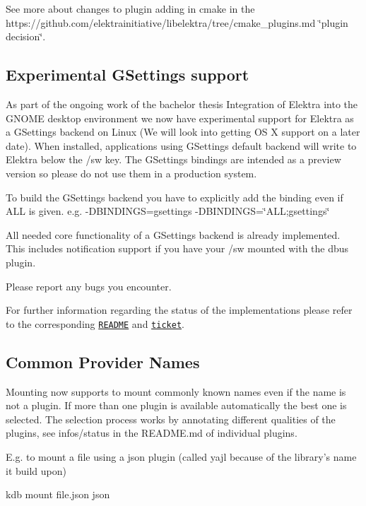 See more about changes to plugin adding in cmake in the https\+://github.com/elektrainitiative/libelektra/tree/cmake\+\_\+plugins.\+md \char`\"{}plugin decision\char`\"{}.

\subsection*{Experimental G\+Settings support}

As part of the ongoing work of the bachelor thesis {\ttfamily Integration of Elektra into the G\+N\+O\+M\+E desktop environment} we now have experimental support for Elektra as a G\+Settings backend on Linux (We will look into getting O\+S X support on a later date). When installed, applications using G\+Settings default backend will write to Elektra below the {\ttfamily /sw} key. The G\+Settings bindings are intended as a preview version so please do not use them in a production system.

To build the G\+Settings backend you have to explicitly add the binding even if {\ttfamily A\+L\+L} is given. e.\+g. {\ttfamily -\/\+D\+B\+I\+N\+D\+I\+N\+G\+S=gsettings} {\ttfamily -\/\+D\+B\+I\+N\+D\+I\+N\+G\+S=\char`\"{}\+A\+L\+L;gsettings\char`\"{}}

All needed core functionality of a G\+Settings backend is already implemented. This includes notification support if you have your {\ttfamily /sw} mounted with the dbus plugin.

Please report any bugs you encounter.

For further information regarding the status of the implementations please refer to the corresponding \href{https://github.com/elektrainitiative/libelektra/tree/gsettings-backend/src/bindings/gsettings}{\tt R\+E\+A\+D\+M\+E} and \href{https://github.com/ElektraInitiative/libelektra/issues/775}{\tt ticket}.

\subsection*{Common Provider Names}

Mounting now supports to mount commonly known names even if the name is not a plugin. If more than one plugin is available automatically the best one is selected. The selection process works by annotating different qualities of the plugins, see {\ttfamily infos/status} in the R\+E\+A\+D\+M\+E.\+md of individual plugins.

E.\+g. to mount a file using a json plugin (called yajl because of the library's name it build upon) \begin{DoxyVerb}kdb mount file.json json
\end{DoxyVerb}


